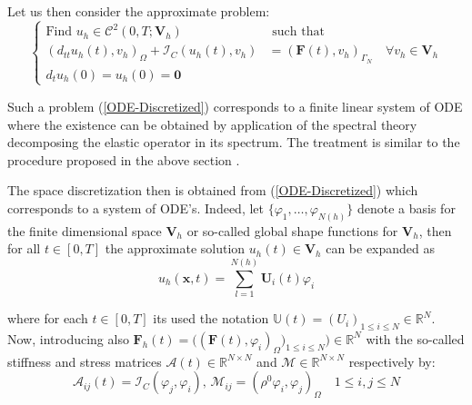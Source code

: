 Let us then consider the approximate problem:
\begin{equation}
\label{ODE-Discretized}
    \left \{
    \begin{array}{cc}
        \text{Find } u_h \in \mathcal{C}^2(0,T; \mathbf{V}_h) & \text{ such that } \\
        (d_{tt} u_h(t), v_h)_{\Omega} + \mathcal{I}_C(u_h(t), v_h) & = (\mathbf{F}(t), v_h)_{\Gamma_N} \quad \forall v_h \in \mathbf{V}_h\\
        d_t u_h(0) = u_h(0) = \mathbf{0} & 
    \end{array}
    \right. 
\end{equation}

Such a problem (\ref{ODE-Discretized}) corresponds to a finite linear system of ODE where the existence can be obtained by application of the spectral theory decomposing the elastic operator in its spectrum. The treatment is similar to the procedure proposed in the above section \cite{raviart1983introduction}.

The space discretization then is obtained from (\ref{ODE-Discretized}) which corresponds to a system of ODE's. Indeed, let $\{ \varphi_1, \dots, \varphi_{N(h)} \}$ denote a basis for the finite dimensional space $\mathbf{V}_h$ or so-called global shape functions for $\mathbf{V}_h$, then for all $t \in [0,T]$ the approximate solution $u_h(t) \in \mathbf{V}_h$ can be expanded as
\begin{equation*}
    u_h(\mathbf{x},t) = \sum \limits_{l=1}^{N(h)} \mathbf{U}_i(t) \varphi_i
\end{equation*}

where for each $t \in [0,T]$ its used the notation $\mathbb{U}(t) = (U_i)_{1 \leq i \leq N} \in \mathbb{R}^N$. Now, introducing also $\mathbf{F}_h(t) = \big( (\mathbf{F}(t), \varphi_i)_{\Omega} \big)_{1 \leq i \leq N} \big) \in \mathbb{R}^N$ with the so-called stiffness and stress matrices $\mathcal{A}(t) \in \mathbb{R}^{N \times N}$ and $\mathcal{M} \in \mathbb{R}^{N \times N}$ respectively by:
\begin{equation*}
    \mathcal{A}_{ij}(t) = \mathcal{I}_C(\varphi_j, \varphi_i), \, \mathcal{M}_{ij} = (\rho^0 \varphi_i , \varphi_j)_{\Omega} \quad 1 \leq i,j \leq N
\end{equation*}

